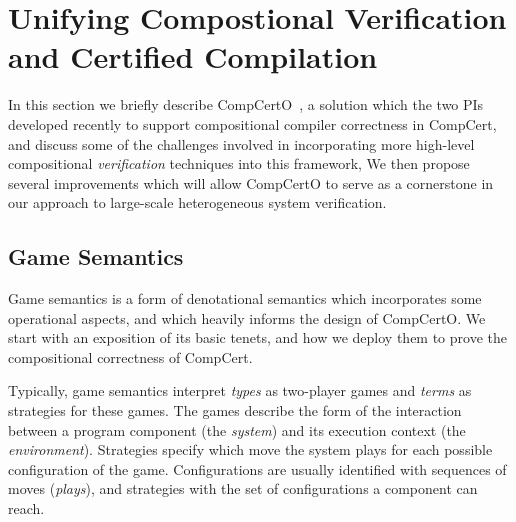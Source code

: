 \section{Unifying Compostional Verification and Certified Compilation}
\label{sec:compcerto}

In this section we briefly describe CompCertO~\cite{compcerto},
a solution which the two PIs developed recently 
to support compositional compiler correctness in CompCert,
and discuss some of the challenges involved in
incorporating more high-level compositional \emph{verification} techniques
into this framework,
We then propose several improvements which will
allow CompCertO to serve as a cornerstone
in our approach to large-scale heterogeneous system verification.

\subsection{Game Semantics} \label{sec:gamesem} %


Game semantics is a form of denotational semantics which
incorporates some operational aspects,
and which heavily informs the design of CompCertO.
We start with an exposition of its basic tenets,
and how we deploy them to prove the compositional correctness of CompCert.

Typically,
game semantics interpret
\emph{types} as two-player games
and \emph{terms} as strategies for these games.
The games describe the form of the interaction
between a program component %
(the \emph{system})
and its execution context
(the \emph{environment}).
Strategies
specify which move the system plays
for each possible configuration of the game.
Configurations are usually identified with sequences of moves
(\emph{plays}),
and strategies with the set of configurations
a component can reach.



